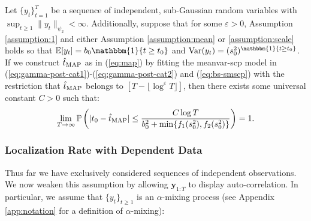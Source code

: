 \begin{theorem}\label{theorem:smscp}
Let $\{y_t\}_{t=1}^T$ be a sequence of independent, sub-Gaussian random variables with $\sup_{t \geq 1} \lVert y_t\rVert_{\psi_2} < \infty$. Additionally, suppose that for some $\varepsilon >0$, Assumption \ref{assumption:1} and either Assumption \ref{assumption:mean} or \ref{assumption:scale} holds so that $\E[y_t] = b_0\mathbbm{1}\{t\geq t_0\}$ and $\normalfont{\Var}(y_t) = (s_0^2)^{\mathbbm{1}\{t\geq t_0\}}$. If we construct $\hat{t}_{\normalfont \text{MAP}}$ as in (\ref{eq:map}) by fitting the meanvar-scp model in (\ref{eq:gamma-post-cat1})-(\ref{eq:gamma-post-cat2}) and (\ref{eq:bs-smscp}) with the restriction that $\hat{t}_{\normalfont \text{MAP}}$ belongs to $[T - \lfloor \log^\varepsilon T\rfloor]$, then there exists some universal constant $C > 0$ such that:
    \vspace{-5pt}
    \begin{align}
        \lim_{T\to\infty}\Pr\left(|t_0 - \hat{t}_{\normalfont \text{MAP}}| \leq \frac{C \log T}{b_0^2 + \min\{f_1(s_0^2),f_2(s_0^2)\}} \right) = 1. \label{eq:thm-3}
    \end{align}
\end{theorem}

\subsubsection{Localization Rate with Dependent Data}

Thus far we have exclusively considered sequences of independent observations. We now weaken this assumption by allowing $\mathbf{y}_{1:T}$ to display auto-correlation. In particular, we assume that $\{y_t\}_{t \geq 1}$ is an $\alpha$-mixing process (see Appendix \ref{app:notation} for a definition of $\alpha$-mixing): 

